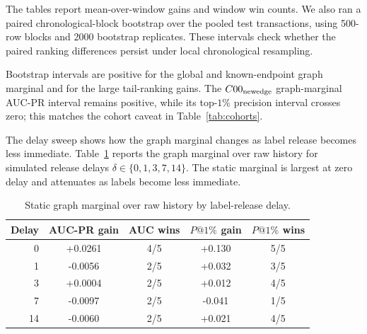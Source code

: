 \documentclass[11pt]{article}
\theoremstyle{definition}
\theoremstyle{remark}
\begin{document}
The tables report mean-over-window gains and window win counts. We also ran a paired chronological-block bootstrap over the pooled test transactions, using 500-row blocks and 2000 bootstrap replicates. These intervals check whether the paired ranking differences persist under local chronological resampling.

\begin{table}[h]
\centering
\caption{Paired chronological-block bootstrap confidence intervals over pooled test transactions.}
\label{tab:bootstrap-ci}
\end{table}

Bootstrap intervals are positive for the global and known-endpoint graph marginal and for the large tail-ranking gains. The $C00_{\rm newedge}$ graph-marginal AUC-PR interval remains positive, while its top-$1\%$ precision interval crosses zero; this matches the cohort caveat in Table~\ref{tab:cohorts}.

The delay sweep shows how the graph marginal changes as label release becomes less immediate. Table~\ref{tab:delay-static} reports the graph marginal over raw history for simulated release delays $\delta\in\{0,1,3,7,14\}$. The static marginal is largest at zero delay and attenuates as labels become less immediate.

\begin{table}[h]
\centering
\caption{Static graph marginal over raw history by label-release delay.}
\label{tab:delay-static}
\begin{tabular}{rcccc}
\toprule
Delay & AUC-PR gain & AUC wins & $P@1\%$ gain & $P@1\%$ wins \\
\midrule
0 & +0.0261 & 4/5 & +0.130 & 5/5 \\
1 & -0.0056 & 2/5 & +0.032 & 3/5 \\
3 & +0.0004 & 2/5 & +0.012 & 4/5 \\
7 & -0.0097 & 2/5 & -0.041 & 1/5 \\
14 & -0.0060 & 2/5 & +0.021 & 4/5 \\
\bottomrule
\end{tabular}
\end{table}
\end{document}
